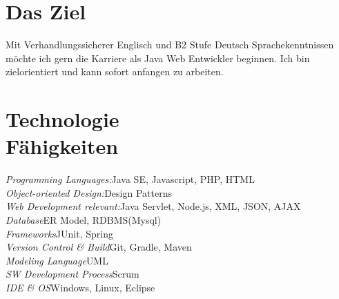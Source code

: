 \documentclass[margin, 10pt]{res} %
\begin{document}
\begin{resume}

 
\section{Das Ziel}  


Mit Verhandlungssicherer Englisch und B2 Stufe Deutsch Sprachekenntnissen möchte ich gern die Karriere als Java\/ Web Entwickler beginnen. Ich bin zielorientiert und kann sofort anfangen zu arbeiten.

\newcommand\tab[1][1cm]{\hspace*{#1}}
\section{Technologie \\ Fähigkeiten} 

{\sl Programming Languages:}\hfill		Java SE, Javascript, PHP, HTML\\
{\sl Object-oriented Design:}\hfill 		Design Patterns\\
{\sl Web Development relevant:}\hfill 	Java Servlet, Node.js, XML, JSON, AJAX\\
{\sl Database}\hfill 						ER Model, RDBMS(Mysql)\\ 
{\sl Frameworks}\hfill  					JUnit, Spring\\
{\sl Version Control \& Build}\hfill 	Git, Gradle, Maven\\
{\sl Modeling Language}\hfill 				UML\\
{\sl SW Development Process}\hfill 		Scrum\\
{\sl IDE \& OS}\hfill  					Windows, Linux, Eclipse


\end{resume}
\end{document}
